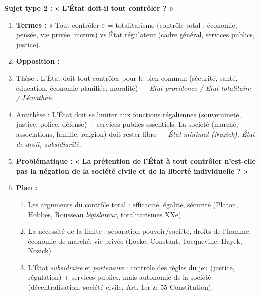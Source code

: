\documentclass[11pt]{article}
\begin{document}
\begin{methode}
\textbf{Sujet type 2 : « L'État doit-il tout contrôler ? »}
\begin{enumerate}
    \item \textbf{Termes :} « Tout contrôler » = totalitarisme (contrôle total : économie, pensée, vie privée, mœurs) vs État régulateur (cadre général, services publics, justice).
    \item \textbf{Opposition :}
        \item Thèse : L'État doit tout contrôler pour le bien commun (sécurité, santé, éducation, économie planifiée, moralité) — \emph{État providence / État totalitaire / Léviathan}.
        \item Antithèse : L'État doit se limiter aux fonctions régaliennes (souveraineté, justice, police, défense) + services publics essentiels. La société (marché, associations, famille, religion) doit rester libre — \emph{État minimal (Nozick), État de droit, subsidiarité}.
    \item \textbf{Problématique :} \textbf{« La prétention de l'État à tout contrôler n'est-elle pas la négation de la société civile et de la liberté individuelle ? »}
    \item \textbf{Plan :}
        \begin{enumerate}
            \item Les arguments du contrôle total : efficacité, égalité, sécurité (Platon, Hobbes, Rousseau \emph{législateur}, totalitarismes XXe).
            \item La nécessité de la limite : séparation pouvoir/société, droits de l'homme, économie de marché, vie privée (Locke, Constant, Tocqueville, Hayek, Nozick).
            \item L'État \emph{subsidiaire} et \emph{partenaire} : contrôle des règles du jeu (justice, régulation) + services publics, mais autonomie de la société (décentralisation, société civile, Art. 1er \& 55 Constitution).
        \end{enumerate}
\end{enumerate}
\end{methode}
\end{document}
